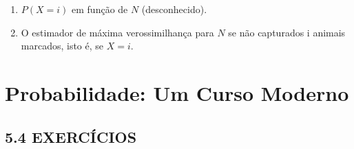 \documentclass[
  10pt,
]{article}
\providecommand{\tightlist}{%
  \setlength{\itemsep}{0pt}\setlength{\parskip}{0pt}}
\begin{document}
\begin{enumerate}
\def\labelenumi{(\alph{enumi})}
\tightlist
\item
  \(P(X = i)\) em função de \(N\) (desconhecido).\\
\item
  O estimador de máxima verossimilhança para \(N\) se não capturados i
  animais marcados, isto é, se \(X = i\).
\end{enumerate}

\section{Probabilidade: Um Curso
Moderno}\label{probabilidade-um-curso-moderno}

\subsection{5.4 EXERCÍCIOS}\label{exercuxedcios-1}
\end{document}
